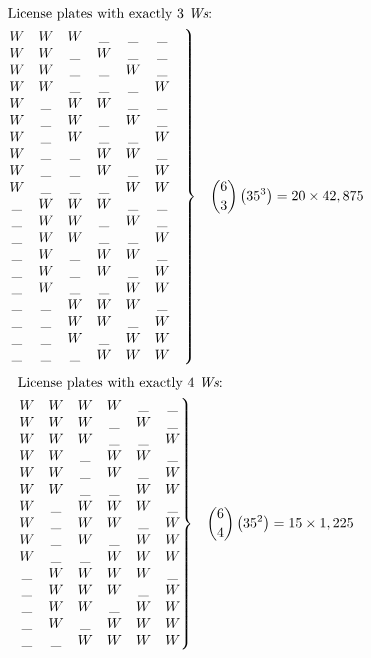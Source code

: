 \documentclass[12pt]{exam}%
\numberwithin{equation}{section}%
\begin{document}
\begin{align*}
 \intertext{License plates with exactly 3 {\em Ws}:}
 \left.\begin{matrix}
 W&W&W&\_&\_&\_\\
 W&W&\_&W&\_&\_\\
 W&W&\_&\_&W&\_\\
 W&W&\_&\_&\_&W\\
 W&\_&W&W&\_&\_\\
 W&\_&W&\_&W&\_\\
 W&\_&W&\_&\_&W\\
 W&\_&\_&W&W&\_\\
 W&\_&\_&W&\_&W\\
 W&\_&\_&\_&W&W\\
 \_&W&W&W&\_&\_\\
 \_&W&W&\_&W&\_\\
 \_&W&W&\_&\_&W\\
 \_&W&\_&W&W&\_\\
 \_&W&\_&W&\_&W\\
 \_&W&\_&\_&W&W\\
 \_&\_&W&W&W&\_\\
 \_&\_&W&W&\_&W\\
 \_&\_&W&\_&W&W\\
 \_&\_&\_&W&W&W&\\
 \end{matrix}\right\} && \binom{6}{3} \left(35 ^ 3 \right) = 20 \times 42,875
\end{align*}
\begin{align*}
 \intertext{License plates with exactly 4 {\em Ws}:}
 \left.\begin{matrix}
 W&W&W&W&\_&\_\\
 W&W&W&\_&W&\_\\
 W&W&W&\_&\_&W\\
 W&W&\_&W&W&\_\\
 W&W&\_&W&\_&W\\
 W&W&\_&\_&W&W\\
 W&\_&W&W&W&\_\\
 W&\_&W&W&\_&W\\
 W&\_&W&\_&W&W\\
 W&\_&\_&W&W&W\\
 \_&W&W&W&W&\_\\
 \_&W&W&W&\_&W\\
 \_&W&W&\_&W&W\\
 \_&W&\_&W&W&W\\
 \_&\_&W&W&W&W\\
 \end{matrix}\right\} && \binom{6}{4} \left(35 ^ 2 \right) = 15 \times 1,225
\end{align*}
\end{document}
